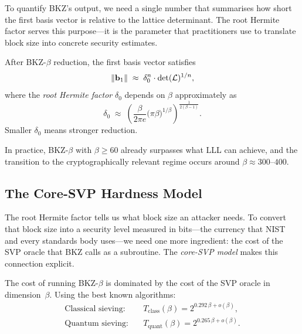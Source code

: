 To quantify BKZ's output, we need a single number that summarises how short the first basis vector is relative to the lattice determinant.  The root Hermite factor serves this purpose---it is the parameter that practitioners use to translate block size into concrete security estimates.

\begin{definition}
\label{def:root-hermite}
After BKZ-$\beta$ reduction, the first basis vector satisfies
\begin{equation}
\left\lVert \mathbf{b}_1 \right\rVert \;\approx\; \delta_0^n \cdot \det(\mathcal{L})^{1/n},
\end{equation}
where the \emph{root Hermite factor} $\delta_0$ depends on $\beta$ approximately as
\begin{equation}
\label{eq:root-hermite}
\delta_0 \;\approx\; \left(\frac{\beta}{2\pi e}\bigl(\pi\beta\bigr)^{1/\beta}\right)^{\frac{1}{2(\beta-1)}}.
\end{equation}
Smaller $\delta_0$ means stronger reduction.
\end{definition}

In practice, BKZ-$\beta$ with $\beta \geq 60$ already surpasses what LLL can achieve, and the transition to the cryptographically relevant regime occurs around $\beta \approx 300$--$400$.


\subsection{The Core-SVP Hardness Model}
\label{subsec:core-svp}

The root Hermite factor tells us what block size an attacker needs.  To convert that block size into a security level measured in bits---the currency that NIST and every standards body uses---we need one more ingredient: the cost of the SVP oracle that BKZ calls as a subroutine.  The \emph{core-SVP model} makes this connection explicit.

\begin{definition}
\label{def:core-svp}
The cost of running BKZ-$\beta$ is dominated by the cost of the SVP oracle in dimension~$\beta$.  Using the best known algorithms:
\begin{align}
\text{Classical sieving:}\quad & T_{\mathrm{class}}(\beta) = 2^{0.292\,\beta + o(\beta)}, \label{eq:classical-sieve}\\
\text{Quantum sieving:}\quad  & T_{\mathrm{quant}}(\beta) = 2^{0.265\,\beta + o(\beta)}. \label{eq:quantum-sieve}
\end{align}
\end{definition}

